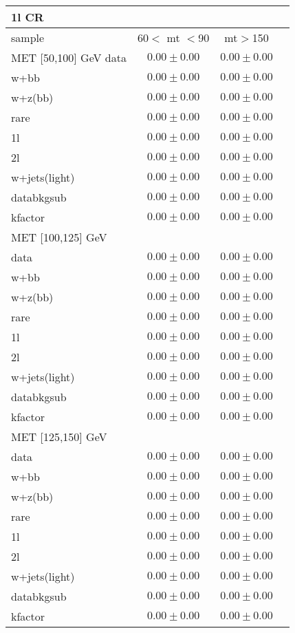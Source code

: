 \begin{table}
\begin{center}
\small
\begin{tabular}{lccc}
\hline
1l CR   & &\\
\hline
sample&60$<$ mt $<$90&mt$>$150\\
\hline
MET [50,100] GeV\hline
data&$0.00\pm0.00$&$0.00\pm0.00$\\
\hline
w+bb&$0.00\pm0.00$&$0.00\pm0.00$\\
w+z(bb)&$0.00\pm0.00$&$0.00\pm0.00$\\
rare&$0.00\pm0.00$&$0.00\pm0.00$\\
1l&$0.00\pm0.00$&$0.00\pm0.00$\\
2l&$0.00\pm0.00$&$0.00\pm0.00$\\
w+jets(light)&$0.00\pm0.00$&$0.00\pm0.00$\\
\hline
databkgsub&$0.00\pm0.00$&$0.00\pm0.00$\\
kfactor&$0.00\pm0.00$&$0.00\pm0.00$\\
\hline\hline
\hline
MET [100,125] GeV  & &\\
\hline
data&$0.00\pm0.00$&$0.00\pm0.00$\\
\hline
w+bb&$0.00\pm0.00$&$0.00\pm0.00$\\
w+z(bb)&$0.00\pm0.00$&$0.00\pm0.00$\\
rare&$0.00\pm0.00$&$0.00\pm0.00$\\
1l&$0.00\pm0.00$&$0.00\pm0.00$\\
2l&$0.00\pm0.00$&$0.00\pm0.00$\\
w+jets(light)&$0.00\pm0.00$&$0.00\pm0.00$\\
\hline
databkgsub&$0.00\pm0.00$&$0.00\pm0.00$\\
kfactor&$0.00\pm0.00$&$0.00\pm0.00$\\
\hline\hline
\hline
MET [125,150] GeV  & &\\
\hline
data&$0.00\pm0.00$&$0.00\pm0.00$\\
\hline
w+bb&$0.00\pm0.00$&$0.00\pm0.00$\\
w+z(bb)&$0.00\pm0.00$&$0.00\pm0.00$\\
rare&$0.00\pm0.00$&$0.00\pm0.00$\\
1l&$0.00\pm0.00$&$0.00\pm0.00$\\
2l&$0.00\pm0.00$&$0.00\pm0.00$\\
w+jets(light)&$0.00\pm0.00$&$0.00\pm0.00$\\
\hline
databkgsub&$0.00\pm0.00$&$0.00\pm0.00$\\
kfactor&$0.00\pm0.00$&$0.00\pm0.00$\\

\end{tabular}
\end{center}
\end{table}
